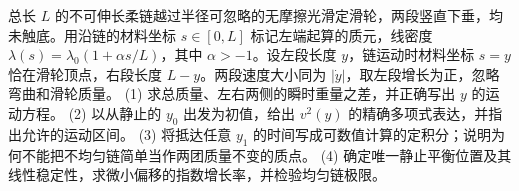 总长 \(L\) 的不可伸长柔链越过半径可忽略的无摩擦光滑定滑轮，两段竖直下垂，均未触底。用沿链的材料坐标 \(s\in[0,L]\) 标记左端起算的质元，线密度 \(\lambda(s)=\lambda_0(1+\alpha s/L)\)，其中 \(\alpha>-1\)。设左段长度 \(y\)，链运动时材料坐标 \(s=y\) 恰在滑轮顶点，右段长度 \(L-y\)。两段速度大小同为 \(|\dot y|\)，取左段增长为正，忽略弯曲和滑轮质量。
(1) 求总质量、左右两侧的瞬时重量之差，并正确写出 \(y\) 的运动方程。
(2) 以从静止的 \(y_0\) 出发为初值，给出 \(v^2(y)\) 的精确多项式表达，并指出允许的运动区间。
(3) 将抵达任意 \(y_1\) 的时间写成可数值计算的定积分；说明为何不能把不均匀链简单当作两团质量不变的质点。
(4) 确定唯一静止平衡位置及其线性稳定性，求微小偏移的指数增长率，并检验均匀链极限。
